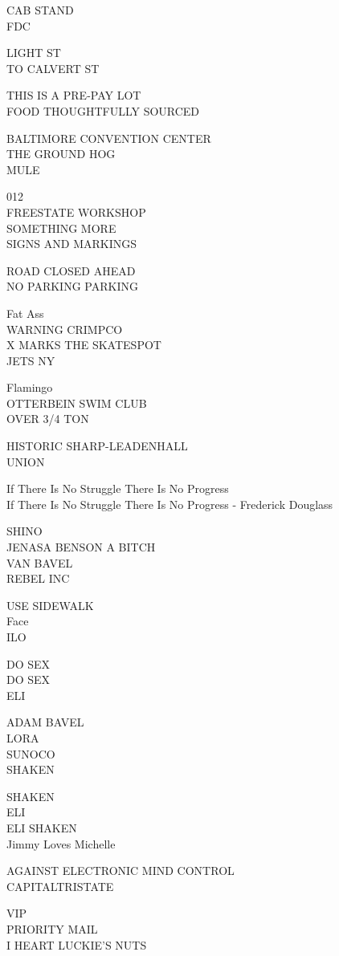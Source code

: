 \documentclass[10pt,letterpaper]{article}
\begin{document}
CAB STAND\\
FDC

LIGHT ST\\
TO CALVERT ST

THIS IS A PRE{-}PAY LOT\\
FOOD THOUGHTFULLY SOURCED

BALTIMORE CONVENTION CENTER\\
THE GROUND HOG\\
MULE

012\\
FREESTATE WORKSHOP\\
SOMETHING MORE\\
SIGNS AND MARKINGS

ROAD CLOSED AHEAD\\
NO PARKING PARKING

Fat Ass\\
WARNING CRIMPCO\\
X MARKS THE SKATESPOT\\
JETS NY

Flamingo\\
OTTERBEIN SWIM CLUB\\
OVER 3/4 TON

HISTORIC SHARP{-}LEADENHALL\\
UNION

If There Is No Struggle There Is No Progress\\
If There Is No Struggle There Is No Progress {-} Frederick Douglass

SHINO\\
JENASA BENSON A BITCH\\
VAN BAVEL\\
REBEL INC

USE SIDEWALK\\
Face\\
ILO

DO SEX\\
DO SEX\\
ELI

ADAM BAVEL\\
LORA\\
SUNOCO\\
SHAKEN

SHAKEN\\
ELI\\
ELI SHAKEN\\
Jimmy Loves Michelle

AGAINST ELECTRONIC MIND CONTROL\\
CAPITALTRISTATE

VIP\\
PRIORITY MAIL\\
I HEART LUCKIE'S NUTS
\end{document}
